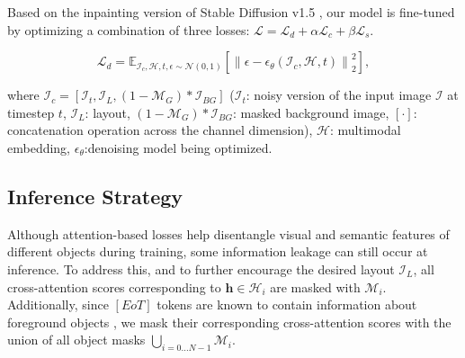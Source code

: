 Based on the inpainting version of Stable Diffusion v1.5 \cite{rombach2022ldm}, our model is fine-tuned by optimizing a combination of three losses: $\mathcal{L} = \mathcal{L}_{d} + \alpha \mathcal{L}_{c} + \beta \mathcal{L}_{s}$. 

\begin{equation}
    \mathcal{L}_{d} = \mathbb{E}_{\mathcal{I}_{c}, \mathcal{H}, t,  \epsilon \sim \mathcal{N} (0,1)} \left[ \left\| \epsilon - \epsilon_\theta\left(\mathcal{I}_{c}, \mathcal{H}, t\right) \right\|_2^2 \right],
\label{eq:lossunet}
\end{equation}

where $\mathcal{I}_{c}=[\mathcal{I}_{t}, \mathcal{I}_{L}, (1-\mathcal{M}_{G})*\mathcal{I}_{BG}]$ ($\mathcal{I}_{t}$: noisy version of the input image $\mathcal{I}$ at timestep $t$, $\mathcal{I}_{L}$: layout, $(1-\mathcal{M}_{G})*\mathcal{I}_{BG}$: masked background image, $[\cdot]$: concatenation operation across the channel dimension), $\mathcal{H}$: multimodal embedding, $\epsilon_\theta$:denoising model being optimized. 



\subsection{Inference Strategy}
\label{sec:inference}

Although attention-based losses help disentangle visual and semantic features of different objects during training, some information leakage can still occur at inference. To address this, and to further encourage the desired layout $\mathcal{I}_L$, all cross-attention scores corresponding to $\mathbf{h} \in \mathcal{H}_i$  are masked with $\mathcal{M}_i$. Additionally, since $[EoT]$ tokens are known to contain information about foreground objects \cite{zhao2023loco}, we mask their corresponding cross-attention scores with the union of all object masks $\bigcup_{i=0\dots N-1} \mathcal{M}_i$. %


